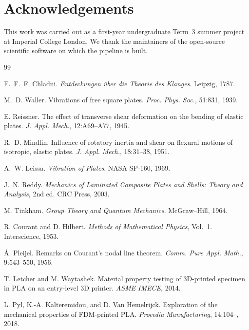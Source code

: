 \documentclass[11pt,a4paper]{article}
\begin{document}
\section*{Acknowledgements}
This work was carried out as a first-year undergraduate Term~3 summer project at
Imperial College London. We thank the maintainers of the open-source scientific
software on which the pipeline is built.

\begin{thebibliography}{99}
\setlength{\itemsep}{2pt}

 E.~F.~F. Chladni. \textit{Entdeckungen \"uber die Theorie
des Klanges}. Leipzig, 1787.

 M.~D. Waller. Vibrations of free square plates.
\textit{Proc. Phys. Soc.}, 51:831, 1939.

 E. Reissner. The effect of transverse shear deformation on
the bending of elastic plates. \textit{J. Appl. Mech.}, 12:A69--A77, 1945.

 R.~D. Mindlin. Influence of rotatory inertia and shear on
flexural motions of isotropic, elastic plates. \textit{J. Appl. Mech.},
18:31--38, 1951.

 A.~W. Leissa. \textit{Vibration of Plates}. NASA SP-160,
1969.

 J.~N. Reddy. \textit{Mechanics of Laminated Composite Plates
and Shells: Theory and Analysis}, 2nd ed. CRC Press, 2003.

 M. Tinkham. \textit{Group Theory and Quantum Mechanics}.
McGraw--Hill, 1964.

 R. Courant and D. Hilbert. \textit{Methods of Mathematical
Physics}, Vol.~1. Interscience, 1953.

 \r{A}. Pleijel. Remarks on Courant's nodal line theorem.
\textit{Comm. Pure Appl. Math.}, 9:543--550, 1956.

 T. Letcher and M. Waytashek. Material property testing of
3D-printed specimen in PLA on an entry-level 3D printer. \textit{ASME IMECE},
2014.

 L. Pyl, K.-A. Kalteremidou, and D. Van Hemelrijck. Exploration
of the mechanical properties of FDM-printed PLA. \textit{Procedia Manufacturing},
14:104--, 2018.


\end{thebibliography}
\end{document}
